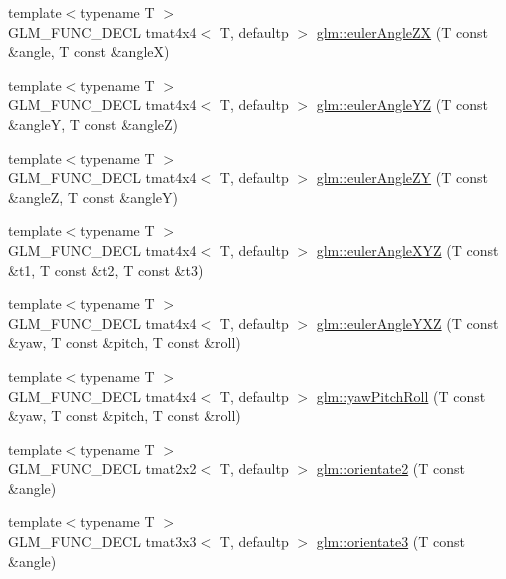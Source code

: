 \begin{DoxyCompactItemize}
\item 
{\footnotesize template$<$typename T $>$ }\\G\+L\+M\+\_\+\+F\+U\+N\+C\+\_\+\+D\+E\+C\+L tmat4x4$<$ T, defaultp $>$ \hyperlink{group__gtx__euler__angles_gaef83cf40bd9ae780011b29970f16f622}{glm\+::euler\+Angle\+Z\+X} (T const \&angle, T const \&angle\+X)
\item 
{\footnotesize template$<$typename T $>$ }\\G\+L\+M\+\_\+\+F\+U\+N\+C\+\_\+\+D\+E\+C\+L tmat4x4$<$ T, defaultp $>$ \hyperlink{group__gtx__euler__angles_ga1033f84f51d61646145352ef0c1bb58c}{glm\+::euler\+Angle\+Y\+Z} (T const \&angle\+Y, T const \&angle\+Z)
\item 
{\footnotesize template$<$typename T $>$ }\\G\+L\+M\+\_\+\+F\+U\+N\+C\+\_\+\+D\+E\+C\+L tmat4x4$<$ T, defaultp $>$ \hyperlink{group__gtx__euler__angles_ga02f037926568bbd12dfece3b28b20343}{glm\+::euler\+Angle\+Z\+Y} (T const \&angle\+Z, T const \&angle\+Y)
\item 
{\footnotesize template$<$typename T $>$ }\\G\+L\+M\+\_\+\+F\+U\+N\+C\+\_\+\+D\+E\+C\+L tmat4x4$<$ T, defaultp $>$ \hyperlink{group__gtx__euler__angles_gaaedda1657a1aebe0a904d864b33844e8}{glm\+::euler\+Angle\+X\+Y\+Z} (T const \&t1, T const \&t2, T const \&t3)
\item 
{\footnotesize template$<$typename T $>$ }\\G\+L\+M\+\_\+\+F\+U\+N\+C\+\_\+\+D\+E\+C\+L tmat4x4$<$ T, defaultp $>$ \hyperlink{group__gtx__euler__angles_ga0242b5ab68651db70c6025815549427f}{glm\+::euler\+Angle\+Y\+X\+Z} (T const \&yaw, T const \&pitch, T const \&roll)
\item 
{\footnotesize template$<$typename T $>$ }\\G\+L\+M\+\_\+\+F\+U\+N\+C\+\_\+\+D\+E\+C\+L tmat4x4$<$ T, defaultp $>$ \hyperlink{group__gtx__euler__angles_gaf9c8d0f1df88c5344165600774489bc5}{glm\+::yaw\+Pitch\+Roll} (T const \&yaw, T const \&pitch, T const \&roll)
\item 
{\footnotesize template$<$typename T $>$ }\\G\+L\+M\+\_\+\+F\+U\+N\+C\+\_\+\+D\+E\+C\+L tmat2x2$<$ T, defaultp $>$ \hyperlink{group__gtx__euler__angles_ga6f465681cbbc575ad93a53ec918dacf3}{glm\+::orientate2} (T const \&angle)
\item 
{\footnotesize template$<$typename T $>$ }\\G\+L\+M\+\_\+\+F\+U\+N\+C\+\_\+\+D\+E\+C\+L tmat3x3$<$ T, defaultp $>$ \hyperlink{group__gtx__euler__angles_gab188e2526dea3c003e86e298f618085e}{glm\+::orientate3} (T const \&angle)

\end{DoxyCompactItemize}
